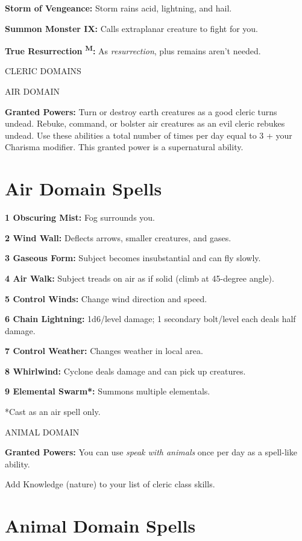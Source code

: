 \documentclass{article}
\begin{document}
\textbf{Storm of Vengeance:} Storm rains acid, lightning, and hail.

\textbf{Summon Monster IX:} Calls extraplanar creature to fight for you.

\textbf{True Resurrection }\textsuperscript{\textbf{M}}\textbf{:} As \textit{resurrection}, 
plus remains aren't needed.

\vspace{12pt}
{\LARGE{}CLERIC DOMAINS}

AIR DOMAIN

\textbf{Granted Powers:} Turn or destroy earth creatures as a good cleric turns 
undead. Rebuke, command, or bolster air creatures as an evil cleric rebukes undead. 
Use these abilities a total number of times per day equal to 3 + your Charisma 
modifier. This granted power is a supernatural ability.

\section*{\textbf{Air Domain Spells}}

\textbf{1 Obscuring Mist:} Fog surrounds you.

\textbf{2 Wind Wall:} Deflects arrows, smaller creatures, and gases.

\textbf{3 Gaseous Form:} Subject becomes insubstantial and can fly slowly.

\textbf{4 Air Walk: }Subject treads on air as if solid (climb at 45-degree angle).

\textbf{5 Control Winds:} Change wind direction and speed.

\textbf{6 Chain Lightning: }1d6/level damage; 1 secondary bolt/level each deals 
half damage.

\textbf{7 Control Weather: }Changes weather in local area.

\textbf{8 Whirlwind: }Cyclone deals damage and can pick up creatures.

\textbf{9 Elemental Swarm*:} Summons multiple elementals.

*Cast as an air spell only.

\vspace{12pt}
ANIMAL DOMAIN

\textbf{Granted Powers:} You can use \textit{speak with animals }once per day as 
a spell-like ability.

Add Knowledge (nature) to your list of cleric class skills.

\section*{\textbf{Animal Domain Spells}}
\end{document}
